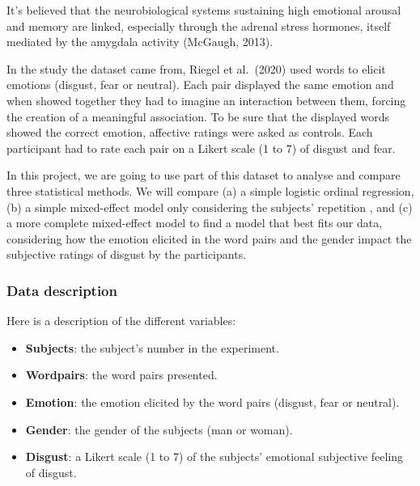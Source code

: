\documentclass[
]{article}
\begin{document}
It's believed that the neurobiological systems sustaining high emotional
arousal and memory are linked, especially through the adrenal stress
hormones, itself mediated by the amygdala activity (McGaugh, 2013).

In the study the dataset came from, Riegel et al.~(2020) used words to
elicit emotions (disgust, fear or neutral). Each pair displayed the same
emotion and when showed together they had to imagine an interaction
between them, forcing the creation of a meaningful association. To be
sure that the displayed words showed the correct emotion, affective
ratings were asked as controls. Each participant had to rate each pair
on a Likert scale (1 to 7) of disgust and fear.

In this project, we are going to use part of this dataset to analyse and
compare three statistical methods. We will compare (a) a simple logistic
ordinal regression, (b) a simple mixed-effect model only considering the
subjects' repetition , and (c) a more complete mixed-effect model to
find a model that best fits our data, considering how the emotion
elicited in the word pairs and the gender impact the subjective ratings
of disgust by the participants.

\hypertarget{data-description}{%
\subsubsection{Data description}\label{data-description}}

Here is a description of the different variables:

\begin{itemize}
\item
  \textbf{Subjects}: the subject's number in the experiment.
\item
  \textbf{Wordpairs}: the word pairs presented.
\item
  \textbf{Emotion}: the emotion elicited by the word pairs (disgust,
  fear or neutral).
\item
  \textbf{Gender}: the gender of the subjects (man or woman).
\item
  \textbf{Disgust}: a Likert scale (1 to 7) of the subjects' emotional
  subjective feeling of disgust.
\end{itemize}
\end{document}
